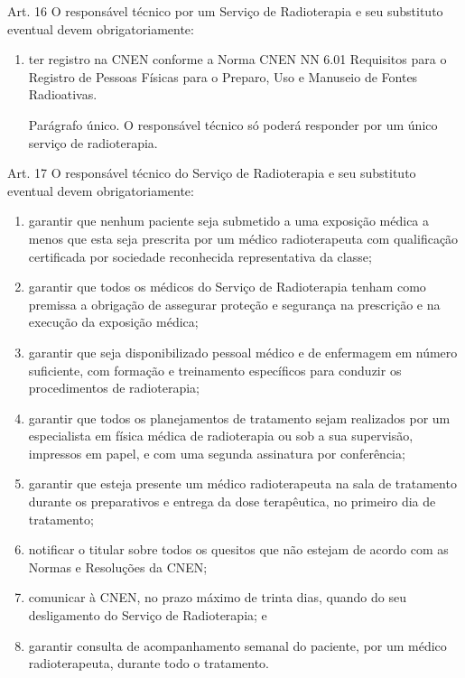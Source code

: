 \noindent Art. 16 O responsável técnico por um Serviço de Radioterapia e seu substituto eventual devem obrigatoriamente:
\begin{enumerate}[label=\Roman*.]
    \item ter registro na CNEN conforme a Norma CNEN NN 6.01 Requisitos para o Registro de Pessoas Físicas para o Preparo, Uso e Manuseio de Fontes Radioativas.
    \par Parágrafo único. O responsável técnico só poderá responder por um único serviço de radioterapia.
\end{enumerate}
\noindent Art. 17 O responsável técnico do Serviço de Radioterapia e seu substituto eventual devem obrigatoriamente:
\begin{enumerate}[label=\Roman*.]
    \item garantir que nenhum paciente seja submetido a uma exposição médica a menos que esta seja prescrita por um médico radioterapeuta com qualificação certificada por sociedade reconhecida representativa da classe;
    \item garantir que todos os médicos do Serviço de Radioterapia tenham como premissa a obrigação de assegurar proteção e segurança na prescrição e na execução da exposição médica;	
    \item garantir que seja disponibilizado pessoal médico e de enfermagem em número suficiente, com formação e treinamento específicos para conduzir os procedimentos de radioterapia;
    \item garantir que todos os planejamentos de tratamento sejam realizados por um especialista em física médica de radioterapia ou sob a sua supervisão, impressos em papel, e com uma segunda assinatura por conferência;
    \item garantir que esteja presente um médico radioterapeuta na sala de tratamento durante os preparativos e entrega da dose terapêutica, no primeiro dia de tratamento;
    \item notificar o titular sobre todos os quesitos que não estejam de acordo com as Normas e Resoluções da CNEN;	
    \item comunicar à CNEN, no prazo máximo de trinta dias, quando do seu desligamento do Serviço de Radioterapia; e
    \item garantir consulta de acompanhamento semanal do paciente, por um médico radioterapeuta, durante todo o tratamento.
\end{enumerate}
